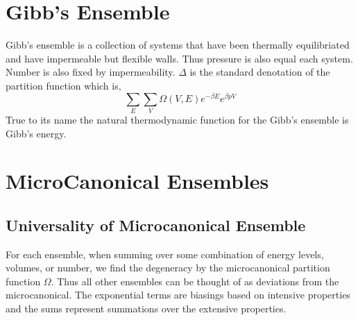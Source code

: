 \section{Gibb's Ensemble}\label{sec:Gibb's Ensemble}
Gibb's ensemble is a collection of systems that have been thermally
equilibriated and have impermeable but flexible walls. Thus pressure is also
equal each system. Number is also fixed by impermeability. $\Delta$ is the
standard denotation of the partition function which is,
\begin{equation*}
\sum_E \sum_V \Omega(V, E)e^{ -\beta E}e^{\beta pV}
\end{equation*}
True to its name the natural thermodynamic function for the Gibb's ensemble is
Gibb's energy.

\section{MicroCanonical Ensembles}%
\label{sec:MicroCanonical}

\subsection{Universality of Microcanonical Ensemble}
For each ensemble, when summing over some combination
of energy levels, volumes, or number, we find the degeneracy by the
microcanonical partition function $\Omega$. Thus all other ensembles can be
thought of as deviations from the microcanonical. The exponential terms are
biasings based on intensive properties and the sums represent summations over
the extensive properties.

